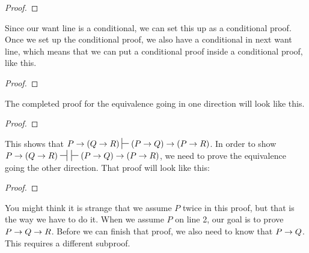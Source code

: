 {\begin{proof}
	
\end{proof}

Since our want line is a conditional, we can set this up as a conditional proof. Once we set up the conditional proof, we also have a conditional in next want line, which means that we can put a conditional proof inside a conditional proof, like this.

\begin{proof}
	
	\open
		
		\open
			
\end{proof}

The completed proof for the equivalence going in one direction will look like this.

\begin{proof}
	
	\open
		
		\open
			
		 
			
		 
		\close
	 
	\close
{} 
\end{proof}

This shows that $P \eif (Q \eif R) \sststile{}{} (P \eif Q) \eif (P \eif R)$. In order to show $P \eif (Q \eif R) \nsststile{}{} \hspace{.5em} \sststile{}{} (P \eif Q) \eif (P \eif R)$, we need to prove the equivalence going the other direction. That proof will look like this:

\begin{proof}
	
	\open
	 
		\open
		 
			\open
			 
			 
			\close
		 
		 
		 
		\close	
{} 
\close
{} 
\end{proof}
You might think it is strange that we assume $P$ twice in this proof, but that is the way we have to do it. When we assume $P$ on line 2, our goal is to prove $P \rightarrow {Q \ensuremath{\rightarrow}R}$. Before we can finish that proof, we also need to know that $P \rightarrow Q$. This requires a different subproof. 

}
